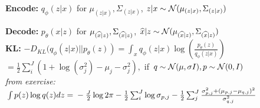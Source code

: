 \textbf{Encode:} $q_\phi(z|x)$ for $\mu_{(z|x)}, \Sigma_{(z|x)}$, $z|x \sim \mathcal{N}(\mu_{(z|x)}, \Sigma_{(z|x)})$\\

\textbf{Decode:} $p_{\theta}(x|z)$ for $\mu_{(\widehat{x}|z)}, \Sigma_{(\widehat{x}|z)}$, $\widehat{x}|z \sim \mathcal{N}(\mu_{(\widehat{x}|z)}, \Sigma_{(\widehat{x}|z)})$\\

\textbf{KL:} $-D_{KL}(q_\phi(z|x) || p_\theta(z)) = \int_x q_\phi(z|x) \log(\frac{p_\theta(z)}{q_\phi(z|x)})$\\
$= \frac{1}{2} \sum^J_i (1+ \log(\sigma_j^2) - \mu_j - \sigma_j^2),$ if $q \sim \mathcal{N}(\mu, \sigma I), p \sim \mathcal{N}(0,I)$\\
\textit{from exercise:} $\int p(z) \log q(z)dz = \\
- \frac{J}{2} \log 2\pi - \frac{1}{2} \sum_i^J \log \sigma_{p,j} - \frac{1}{2} \sum_j^J \frac{\sigma^2_{p,j} + (\mu_{p,j} - \mu_{q,j})^2}{\sigma^2_{q,j}}$\\

